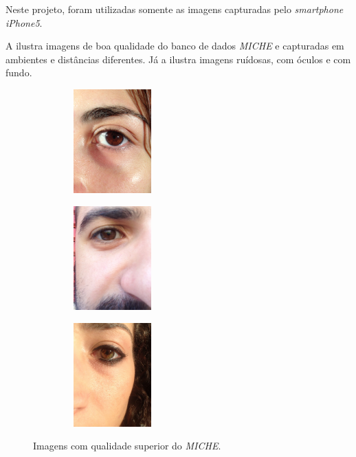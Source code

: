 \par Neste projeto, foram utilizadas somente as imagens capturadas pelo \textit{smartphone} \textit{iPhone5}.

\par A  ilustra imagens de boa qualidade do banco de dados \textit{MICHE} e capturadas em ambientes e distâncias diferentes. Já a  ilustra imagens ruídosas, com óculos e com fundo.

\begin{figure}[h!]
\begin{subfigure}{.3\textwidth}
\centering
\includegraphics[width=4cm,height=4cm]{img/Resultados/miche/boa_1.jpg}
\end{subfigure}\hfill
\begin{subfigure}{.3\textwidth}
\centering
\includegraphics[width=4cm,height=4cm]{img/Resultados/miche/boa_2.jpg}
\end{subfigure}\hfill
\begin{subfigure}{.3\textwidth}
\centering
\includegraphics[width=4cm,height=4cm]{img/Resultados/miche/cabelo.jpg}
\end{subfigure}
\caption{Imagens com qualidade superior do \textit{MICHE}.}
\label{fig:experimentos:miche_boas}
\end{figure}


